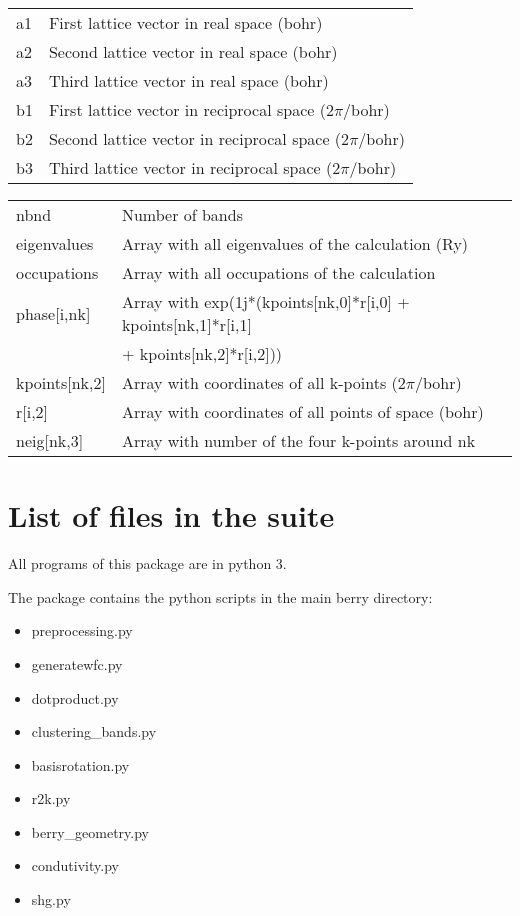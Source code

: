 \documentclass[a4paper,12pt]{report}
\begin{document}
\begin{appendices}
\begin{tabularx}{0.9\textwidth}{lX}
 a1             & First lattice vector in real space (bohr) \\
 a2             & Second lattice vector in real space (bohr) \\
 a3             & Third lattice vector in real space (bohr) \\

 b1             & First lattice vector in reciprocal space ($2\pi$/bohr) \\
 b2             & Second lattice vector in reciprocal space ($2\pi$/bohr) \\
 b3             & Third lattice vector in reciprocal space ($2\pi$/bohr) \\
\end{tabularx}
\vspace{0.5cm}

\begin{tabularx}{0.9\textwidth}{lX}
 nbnd           & Number of bands \\

 eigenvalues    & Array with all eigenvalues of the calculation (Ry) \\
 occupations    & Array with all occupations of the calculation \\

 phase[i,nk]    & Array with exp(1j*(kpoints[nk,0]*r[i,0] + kpoints[nk,1]*r[i,1] \\
                & \hspace*{3cm}+ kpoints[nk,2]*r[i,2])) \\
 kpoints[nk,2]  & Array with coordinates of all k-points ($2\pi$/bohr) \\
 r[i,2]         & Array with coordinates of all points of space (bohr) \\

 neig[nk,3]     & Array with number of the four k-points around nk \\
\end{tabularx}


\chapter{List of files in the suite}
 All programs of this package are in python 3.

The package contains the python scripts in the main berry directory:
\begin{itemize}
 \item preprocessing.py
 \item generatewfc.py
 \item dotproduct.py
 \item clustering\_bands.py
 \item basisrotation.py
 \item r2k.py
 \item berry\_geometry.py
 \item condutivity.py
 \item shg.py
\end{itemize}\medskip


\end{appendices}
\end{document}
